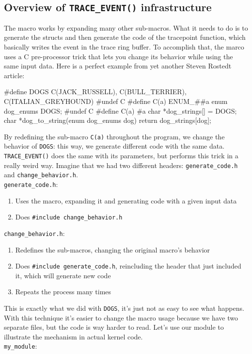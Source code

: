 \subsection{Overview of \texttt{TRACE\_EVENT()} infrastructure}
The macro works by expanding many other sub-macros. What it needs to do is to generate the structs and then generate the code of the tracepoint function, which basically writes the event in the trace ring buffer. To accomplish that, the marco uses a C pre-processor trick that lets you change its behavior while using the same input data. Here is a perfect example from yet another Steven Rostedt article:\cite{trace_event}
\begin{code}
#define DOGS { C(JACK_RUSSELL), C(BULL_TERRIER), C(ITALIAN_GREYHOUND) }
#undef C
#define C(a) ENUM_##a
enum dog_enums DOGS;
#undef C
#define C(a) #a
char *dog_strings[] = DOGS;
char *dog_to_string(enum dog_enums dog)
{
       return dog_strings[dog];
}
\end{code}
By redefining the sub-macro \verb|C(a)| throughout the program, we change the behavior of \verb|DOGS|: this way, we generate different code with the same data. \verb|TRACE_EVENT()| does the same with its parameters, but performs this trick in a really weird way. Imagine that we had two different headers: \verb|generate_code.h| and \verb|change_behavior.h|. \\\verb|generate_code.h|:
\begin{enumerate}
    \item Uses the macro, expanding it and generating code with a given input data
    \item Does \verb|#include change_behavior.h|
\end{enumerate}
\verb|change_behavior.h|:
\begin{enumerate}
    \item Redefines the sub-macros, changing the original macro's behavior
    \item Does \verb|#include generate_code.h|, reincluding the header that just included it, which will generate new code
    \item Repeats the process many times
\end{enumerate}
This is exactly what we did with \verb|DOGS|, it's just not as easy to see what happens. With this technique it's easier to change the macro usage because we have two separate files, but the code is way harder to read. Let's use our module to illustrate the mechanism in actual kernel code.\\\verb|my_module|:

